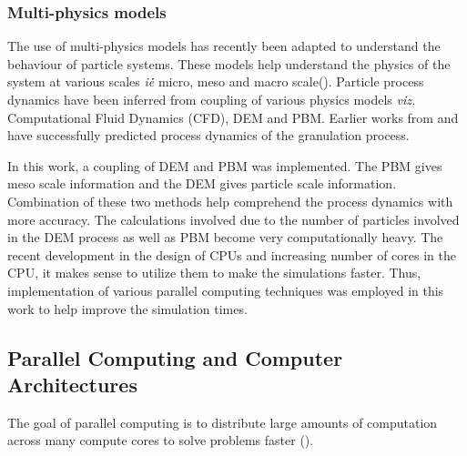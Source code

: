 \documentclass[preprint,11pt,authoryear]{elsarticle}
\begin{document}
	
	    \subsubsection{Multi-physics models}
		\par The use of multi-physics models has recently been adapted to understand the behaviour of particle systems. These models help understand the physics of the system at various scales \textit{i\.e\.} micro, meso and macro scale(\cite{sen2014}). Particle process dynamics have been inferred from coupling of various physics models \textit{viz.} Computational Fluid Dynamics (CFD), DEM and PBM. Earlier works from \cite{sen2014} and \cite{Barrasso2015cerd} have successfully predicted process dynamics of the granulation process.
		\par In this work, a coupling of DEM and PBM was implemented. The PBM gives meso scale information and the DEM gives particle scale information. Combination of these two methods help comprehend the process dynamics with more accuracy. The calculations involved due to the number of particles involved in the DEM process as well as PBM become very computationally heavy. The recent development in the design of CPUs and increasing number of cores in the CPU, it makes sense to utilize them to make the simulations faster. Thus, implementation of various parallel computing techniques was employed in this work to help improve the simulation times.  
	
	
	  \subsection{Parallel Computing and Computer Architectures}
	    \par The goal of parallel computing is to distribute large amounts of computation across many compute cores to solve problems faster (\cite{wilkinson2005}).
\end{document}
